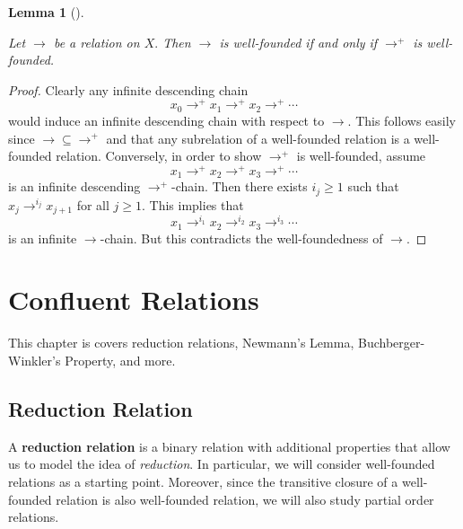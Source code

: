 \documentclass[
  letterpaper,
  10pt,
  reqno,
  twopage,
  openany]{book}
\theoremstyle{plain}
\newtheorem{lemma}{Lemma}[chapter]
\theoremstyle{definition}
\theoremstyle{definition}
\theoremstyle{definition}
\theoremstyle{plain}
\theoremstyle{plain}
\theoremstyle{remark}
\begin{document}
\leavevmode{}%
\begin{lemma}[]\label{lem-well-founded-char}

Let \(\longrightarrow\) be a relation on \(X.\) Then \(\longrightarrow\)
is well-founded if and only if \(\longrightarrow^+\) is well-founded.

\end{lemma}

\begin{proof}

Clearly any infinite descending chain \[
x_0 \longrightarrow^+ x_1 \longrightarrow^+ x_2 \longrightarrow^+ \cdots
\] would induce an infinite descending chain with respect to
\(\longrightarrow.\) This follows easily since
\(\longrightarrow\subseteq \longrightarrow^+\) and that any subrelation
of a well-founded relation is a well-founded relation. Conversely, in
order to show \(\longrightarrow^+\) is well-founded, assume \[
x_1 \longrightarrow^+ x_2 \longrightarrow^+ x_3  \longrightarrow^+\cdots 
\] is an infinite descending \(\longrightarrow^+\)-chain. Then there
exists \(i_j\geq 1\) such that \(x_j\longrightarrow^{i_j} x_{j+1}\) for
all \(j\geq 1.\) This implies that \[
x_1 \longrightarrow^{i_1} x_2 \longrightarrow^{i_2} x_3 \longrightarrow^{i_3} \cdots 
\] is an infinite \(\longrightarrow\)-chain. But this contradicts the
well-foundedness of \(\longrightarrow.\)

\end{proof}

\hypertarget{confluent-relations}{%
\section{Confluent Relations}\label{confluent-relations}}

This chapter is covers reduction relations, Newmann's Lemma,
Buchberger-Winkler's Property, and more.

\hypertarget{reduction-relation}{%
\subsection{Reduction Relation}\label{reduction-relation}}

A  \textbf{reduction relation} is a binary
relation with additional properties that allow us to model the idea of
\emph{reduction}. In particular, we will consider well-founded relations
as a starting point. Moreover, since the transitive closure of a
well-founded relation is also well-founded relation, we will also study
partial order relations.
\end{document}
